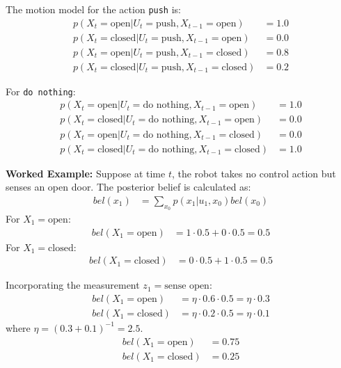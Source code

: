 \documentclass[12pt]{article}
\begin{document}
The motion model for the action \texttt{push} is:
\begin{align}
    p(X_t = \text{open} | U_t = \text{push}, X_{t-1} = \text{open}) &= 1.0 \\
    p(X_t = \text{closed} | U_t = \text{push}, X_{t-1} = \text{open}) &= 0.0 \\
    p(X_t = \text{open} | U_t = \text{push}, X_{t-1} = \text{closed}) &= 0.8 \\
    p(X_t = \text{closed} | U_t = \text{push}, X_{t-1} = \text{closed}) &= 0.2
\end{align}

For \texttt{do nothing}:
\begin{align}
    p(X_t = \text{open} | U_t = \text{do nothing}, X_{t-1} = \text{open}) &= 1.0 \\
    p(X_t = \text{closed} | U_t = \text{do nothing}, X_{t-1} = \text{open}) &= 0.0 \\
    p(X_t = \text{open} | U_t = \text{do nothing}, X_{t-1} = \text{closed}) &= 0.0 \\
    p(X_t = \text{closed} | U_t = \text{do nothing}, X_{t-1} = \text{closed}) &= 1.0
\end{align}

\textbf{Worked Example:}
Suppose at time $t$, the robot takes no control action but senses an open door. The posterior belief is calculated as:
\begin{align}
    bel(x_1) &= \sum_{x_0} p(x_1 | u_1, x_0) bel(x_0)
\end{align}
For $X_1 = \text{open}$:
\begin{align}
    bel(X_1 = \text{open}) &= 1 \cdot 0.5 + 0 \cdot 0.5 = 0.5
\end{align}
For $X_1 = \text{closed}$:
\begin{align}
    bel(X_1 = \text{closed}) &= 0 \cdot 0.5 + 1 \cdot 0.5 = 0.5
\end{align}

Incorporating the measurement $z_1 = \text{sense open}$:
\begin{align}
    bel(X_1 = \text{open}) &= \eta \cdot 0.6 \cdot 0.5 = \eta \cdot 0.3 \\
    bel(X_1 = \text{closed}) &= \eta \cdot 0.2 \cdot 0.5 = \eta \cdot 0.1
\end{align}
where $\eta = (0.3 + 0.1)^{-1} = 2.5$.
\begin{align}
    bel(X_1 = \text{open}) &= 0.75 \\
    bel(X_1 = \text{closed}) &= 0.25
\end{align}
\end{document}
